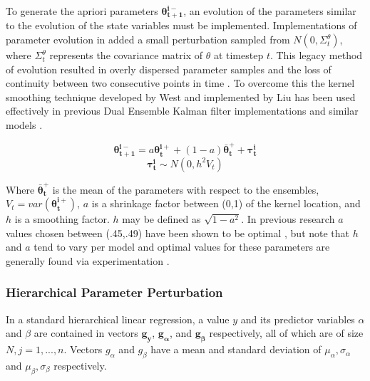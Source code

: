 To generate the apriori parameters $\mathbf{\theta^{i-}_{t+1}}$, an evolution of the parameters similar to the evolution of the state variables must be implemented. Implementations of parameter evolution in \cite{TodiniESzollosi-NagyA1976} added a small perturbation sampled from $N(0,\Sigma^{\theta}_{t})$, where $\Sigma^{\theta}_{t}$ represents the covariance matrix of $\theta$ at timestep $t$. This legacy method of evolution resulted in overly dispersed parameter samples and the loss of continuity between two consecutive points in time \cite{Liu2000} \cite{Chen2008}. To overcome this the kernel smoothing technique developed by West \cite{West1993} and implemented by Liu \cite{Liu2000} has been used effectively in previous Dual Ensemble Kalman filter implementations \cite{Moradkhani2005} and similar models \cite{Chen2008}.

\begin{equation}\label{eq:hdekf_thetaminus_old}
\mathbf{\theta_{t+1}^{i-}} = a\mathbf{\theta_{t}^{i+}} + (1-a)\mathbf{\bar{\theta}_{t}^{+}} + \mathbf{\tau_{t}^{i}}
\end{equation}
\begin{equation}\label{eq:hdekf_tau_old}
\mathbf{\tau_{t}^{i}} \sim N(0, h^{2}V_{t})
\end{equation}

Where $\mathbf{\bar{\theta}_{t}^{+}}$ is the mean of the parameters with respect to the ensembles, $V_{t} = var(\mathbf{\theta_{t}^{i+}})$, $a$ is a shrinkage factor between (0,1) of the kernel location, and $h$ is a smoothing factor. $h$ may be defined as $\sqrt{1-a^{2}}$. In previous research $a$ values chosen between (.45,.49) have been shown to be optimal \cite{Chen2008}, but note that $h$ and $a$ tend to vary per model and optimal values for these parameters are generally found via experimentation  \cite{Moradkhani2005}  \cite{Anderson1999} \cite{Annan2005} \cite{Chen2008}.

\subsubsection{Hierarchical Parameter Perturbation}

In a standard hierarchical linear regression, a value $y$ and its predictor variables $\alpha$ and $\beta$ are contained in vectors $\mathbf{g_{y}}$, $\mathbf{g_{\alpha}}$, and $\mathbf{g_{\beta}}$ respectively, all of which are of size $N, j=1,...,n$. Vectors $g_{\alpha}$ and $g_{\beta}$ have a mean and standard deviation of $\mu_{\alpha}, \sigma_{\alpha}$ and $\mu_{\beta} , \sigma_{\beta}$ respectively.

